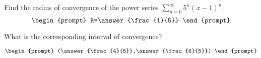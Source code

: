 \documentclass{ximera}
\author{Gregory Hartman \and Matthew Carr}
\begin{document}
\begin{exercise}




Find the radius of convergence of the power series $\sum_{n=0}^{\infty}5^{n}(x-1)^{n}$.
\[
\begin{prompt}
R=\answer{\frac{1}{5}}
\end{prompt}
\]

What is the corresponding interval of convergence?

\[
\begin{prompt}
(\answer{\frac{4}{5}},\answer{\frac{6}{5}})
\end{prompt}
\]

\end{exercise}
\end{document}

